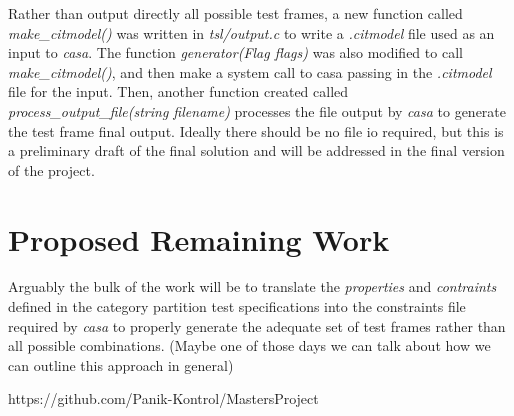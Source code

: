 \documentclass[a4full,12pt]{article}
\newcommand{\eas}[1]{{\color{blue}\sf ({#1})}}
\begin{document}
Rather than output directly all possible test frames, a new function called
  \emph{make\_citmodel()} was written in \emph{tsl/output.c} to write a 
  \emph{.citmodel} file used as an input to \emph{casa}. The function
  \emph{generator(Flag flags)} was also modified to call \emph{make\_citmodel()},
  and then make a system call to casa passing in the \emph{.citmodel} file for
  the input. Then, another function created  called
  \emph{process\_output\_file(string filename)} processes the file output by
  \emph{casa} to generate the test frame final output. Ideally there should be
  no file io required, but this is a preliminary draft of the final solution
  and will be addressed in the final version of the project.
  
  \section{Proposed Remaining Work}
Arguably the bulk of the work will be to translate the \emph{properties} and 
  \emph{contraints} defined in the category partition test specifications into
  the constraints file required by \emph{casa} to properly generate the adequate
  set of test frames rather than all possible combinations. \eas{Maybe one of those days we can talk about how we can outline this approach in general}
  
  https://github.com/Panik-Kontrol/MastersProject
\end{document}
